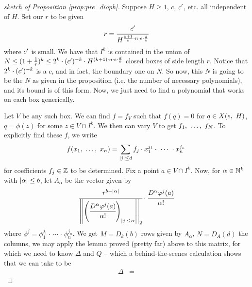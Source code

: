 \begin{proof}[sketch of Proposition \ref{prop:pre_dioph}]
  Suppose $H \geq 1$, $c$, $\pri{c}$, etc. all independent of $H$. Set our $r$ to be given
    \begin{align*}
      r = \cfrac{\pri{c}}{H^{\frac{k + 1}{k} \cdot n \cdot e \cdot \frac{d}{b}}}
    \end{align*}
  where $\pri{c}$ is small. We have that $I^k$ is contained in the union of $N \leq (1 + \frac{1}{r})^k \leq 2^k \cdot (\pri{c})^{-k} \cdot H^{(k+1) \cdot n \cdot e \cdot \frac{d}{b}}$ closed boxes of side length $r$. Notice that $2^k \cdot (\pri{c})^{-k}$ is a $c$, and in fact, the boundary one on $N$. So now, this $N$ is going to be the $N$ as given in the proposition (i.e. the number of necessary polynomials), and its bound is of this form. Now, we just need to find a polynomial that works on each box generically.

  Let $V$ be any such box. We can find $f = f_V$ such that $f(q) = 0$ for $q \in \XeH[H]{e}$, $q = \phi(z)$ for some $z \in V \cap I^k$. We then can vary $V$ to get $\vonevm{f}{N}$. To explicitly find these $f$, we write
    \begin{align*}
      f(\vonevm{x}{n}) = \sum_{\norm{j} \leq d} f_j \cdot x_1^{j_1} \cdot \ \cdots \ \cdot x_n^{j_n}
    \end{align*}
  for coefficients $f_j \in \Z$ to be determined. Fix a point $a \in V \cap I^k$. Now, for $\alpha \in \N^k$ with $\norm{\alpha} \leq b$, let $A_{\alpha}$ be the vector given by
    \begin{align*}
      \cfrac{r^{b - \norm{\alpha}}}{\left\vert\left\vert \left( \cfrac{D^{\alpha} \phi^{j} (a)}{\alpha !} \right)_{\norm{j} \leq \alpha} \right\vert\right\vert_{2} } \cdot \cfrac{D^{\alpha} \phi^{j}(a)}{\alpha !}
    \end{align*}
  where $\phi^{j} = \phi_1^{j_1} \cdot \ \cdots \ \cdot \phi_n^{j_n}$. We get $M = D_k(b)$ rows given by $A_{\alpha}$, $N = D_A(d)$ the columns, we may apply the lemma proved (pretty far) above to this matrix, for which we need to know $\Delta$ and $Q$ -- which a behind-the-scenes calculation shows that we can take to be
    \begin{align*}
      \Delta &=
    \end{align*}

\end{proof}

